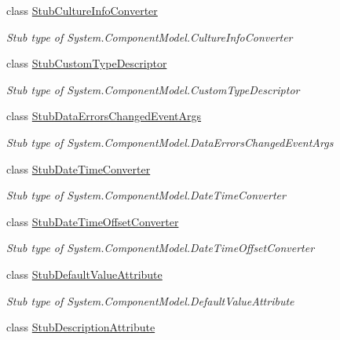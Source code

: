 \begin{DoxyCompactItemize}
class \hyperlink{class_system_1_1_component_model_1_1_fakes_1_1_stub_culture_info_converter}{Stub\-Culture\-Info\-Converter}
\begin{DoxyCompactList}\small\item\em Stub type of System.\-Component\-Model.\-Culture\-Info\-Converter\end{DoxyCompactList}\item 
class \hyperlink{class_system_1_1_component_model_1_1_fakes_1_1_stub_custom_type_descriptor}{Stub\-Custom\-Type\-Descriptor}
\begin{DoxyCompactList}\small\item\em Stub type of System.\-Component\-Model.\-Custom\-Type\-Descriptor\end{DoxyCompactList}\item 
class \hyperlink{class_system_1_1_component_model_1_1_fakes_1_1_stub_data_errors_changed_event_args}{Stub\-Data\-Errors\-Changed\-Event\-Args}
\begin{DoxyCompactList}\small\item\em Stub type of System.\-Component\-Model.\-Data\-Errors\-Changed\-Event\-Args\end{DoxyCompactList}\item 
class \hyperlink{class_system_1_1_component_model_1_1_fakes_1_1_stub_date_time_converter}{Stub\-Date\-Time\-Converter}
\begin{DoxyCompactList}\small\item\em Stub type of System.\-Component\-Model.\-Date\-Time\-Converter\end{DoxyCompactList}\item 
class \hyperlink{class_system_1_1_component_model_1_1_fakes_1_1_stub_date_time_offset_converter}{Stub\-Date\-Time\-Offset\-Converter}
\begin{DoxyCompactList}\small\item\em Stub type of System.\-Component\-Model.\-Date\-Time\-Offset\-Converter\end{DoxyCompactList}\item 
class \hyperlink{class_system_1_1_component_model_1_1_fakes_1_1_stub_default_value_attribute}{Stub\-Default\-Value\-Attribute}
\begin{DoxyCompactList}\small\item\em Stub type of System.\-Component\-Model.\-Default\-Value\-Attribute\end{DoxyCompactList}\item 
class \hyperlink{class_system_1_1_component_model_1_1_fakes_1_1_stub_description_attribute}{Stub\-Description\-Attribute}

\end{DoxyCompactItemize}
